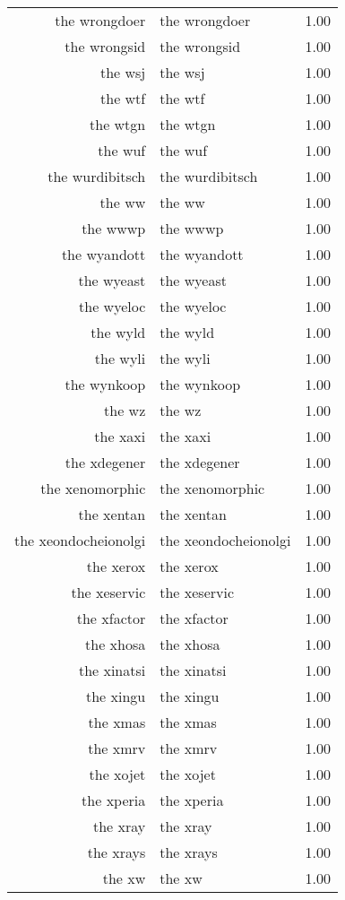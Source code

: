 \begin{table}[ht]
\begin{tabular}{rlr}
  the wrongdoer & the wrongdoer & 1.00 \\ 
  the wrongsid & the wrongsid & 1.00 \\ 
  the wsj & the wsj & 1.00 \\ 
  the wtf & the wtf & 1.00 \\ 
  the wtgn & the wtgn & 1.00 \\ 
  the wuf & the wuf & 1.00 \\ 
  the wurdibitsch & the wurdibitsch & 1.00 \\ 
  the ww & the ww & 1.00 \\ 
  the wwwp & the wwwp & 1.00 \\ 
  the wyandott & the wyandott & 1.00 \\ 
  the wyeast & the wyeast & 1.00 \\ 
  the wyeloc & the wyeloc & 1.00 \\ 
  the wyld & the wyld & 1.00 \\ 
  the wyli & the wyli & 1.00 \\ 
  the wynkoop & the wynkoop & 1.00 \\ 
  the wz & the wz & 1.00 \\ 
  the xaxi & the xaxi & 1.00 \\ 
  the xdegener & the xdegener & 1.00 \\ 
  the xenomorphic & the xenomorphic & 1.00 \\ 
  the xentan & the xentan & 1.00 \\ 
  the xeondocheionolgi & the xeondocheionolgi & 1.00 \\ 
  the xerox & the xerox & 1.00 \\ 
  the xeservic & the xeservic & 1.00 \\ 
  the xfactor & the xfactor & 1.00 \\ 
  the xhosa & the xhosa & 1.00 \\ 
  the xinatsi & the xinatsi & 1.00 \\ 
  the xingu & the xingu & 1.00 \\ 
  the xmas & the xmas & 1.00 \\ 
  the xmrv & the xmrv & 1.00 \\ 
  the xojet & the xojet & 1.00 \\ 
  the xperia & the xperia & 1.00 \\ 
  the xray & the xray & 1.00 \\ 
  the xrays & the xrays & 1.00 \\ 
  the xw & the xw & 1.00 \\ 

\end{tabular}
\end{table}
